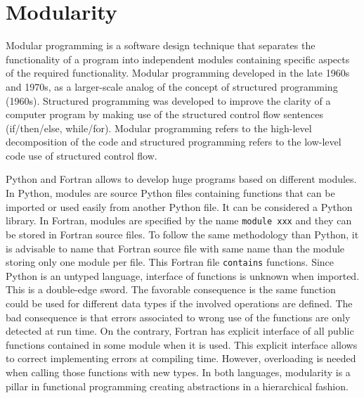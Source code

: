  
\newpage   
\section{Modularity} 
Modular programming is a software design technique that separates 
the functionality of a program into independent modules containing 
specific aspects  of the required functionality.
Modular programming developed in the late 1960s and 1970s, 
as a larger-scale analog of the concept of structured programming (1960s).
Structured programming was developed to improve the clarity of a computer 
program by making use of the structured control flow sentences (if/then/else, while/for).
Modular programming  refers to the high-level decomposition of the code 
and structured programming refers 
to the low-level code use of structured control flow.

Python and Fortran allows to develop huge programs based on different modules.
In Python,  modules are source Python files containing functions that 
can be imported or used easily from another Python file. It can be considered a Python library. 
In Fortran, modules are specified by the name \verb|module xxx| and they can be stored in Fortran
source files. To follow the same methodology than Python, it is advisable to name that 
Fortran source file with same name  than the module storing only one module per file. This 
Fortran file \verb|contains| functions. 
Since Python is an untyped language, interface of functions is unknown when imported. 
This is a double-edge sword. The favorable consequence is the same function could be used 
for different data types if the involved operations are defined. The bad consequence is that 
errors associated to wrong use of the functions are only detected at run time. 
On the contrary, Fortran has explicit interface of all public functions contained in some module 
when it is used. This explicit interface allows to correct 
implementing errors at compiling time. However, overloading is needed when 
calling those functions with new types. 
In both languages, modularity is a pillar in functional programming creating 
abstractions in a hierarchical fashion.

